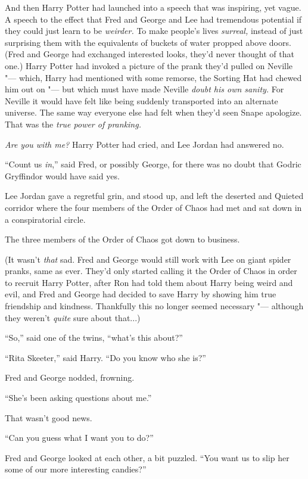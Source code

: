 And then Harry Potter had launched into a speech that was inspiring, yet
vague. A speech to the effect that Fred and George and Lee had
tremendous potential if they could just learn to be \emph{weirder.} To
make people's lives \emph{surreal,} instead of just surprising them with
the equivalents of buckets of water propped above doors. (Fred and
George had exchanged interested looks, they'd never thought of that
one.) Harry Potter had invoked a picture of the prank they'd pulled on
Neville "--- which, Harry had mentioned with some remorse, the Sorting Hat
had chewed him out on "--- but which must have made Neville \emph{doubt his
own sanity.} For Neville it would have felt like being suddenly
transported into an alternate universe. The same way everyone else had
felt when they'd seen Snape apologize. That was the \emph{true power of
pranking.}

\emph{Are you with me?} Harry Potter had cried, and Lee Jordan had
answered no.

``Count us \emph{in},'' said Fred, or possibly George, for there was no
doubt that Godric Gryffindor would have said yes.

Lee Jordan gave a regretful grin, and stood up, and left the deserted
and Quieted corridor where the four members of the Order of Chaos had
met and sat down in a conspiratorial circle.

The three members of the Order of Chaos got down to business.

(It wasn't \emph{that} sad. Fred and George would still work with Lee on
giant spider pranks, same as ever. They'd only started calling it the
Order of Chaos in order to recruit Harry Potter, after Ron had told them
about Harry being weird and evil, and Fred and George had decided to
save Harry by showing him true friendship and kindness. Thankfully this
no longer seemed necessary "--- although they weren't \emph{quite} sure
about that...)

``So,'' said one of the twins, ``what's this about?''

``Rita Skeeter,'' said Harry. ``Do you know who she is?''

Fred and George nodded, frowning.

``She's been asking questions about me.''

That wasn't good news.

``Can you guess what I want you to do?''

Fred and George looked at each other, a bit puzzled. ``You want us to
slip her some of our more interesting candies?''

